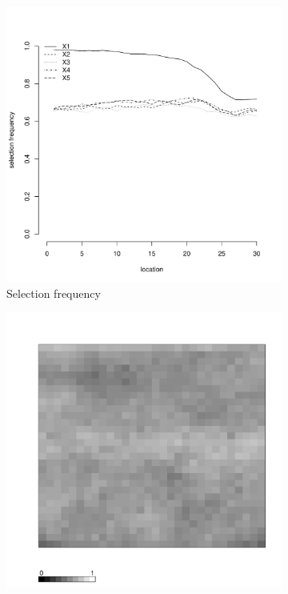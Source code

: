 \documentclass[authoryear, review, 11pt]{elsarticle}
\begin{document}
\begin{figure}
\begin{subfigure}[b]{0.45\textwidth}
		\includegraphics[width=\textwidth]{../../figures/simulation/15.12.profile_selection.pdf}
		\caption{Selection frequency}
	\end{subfigure}
	\begin{subfigure}[b]{0.45\textwidth}
	\centering
		\includegraphics[width=\textwidth]{../../figures/simulation/X1.15.12.unshrunk_bootstrap_coverage.pdf}

\end{subfigure}
\end{figure}
\end{document}
